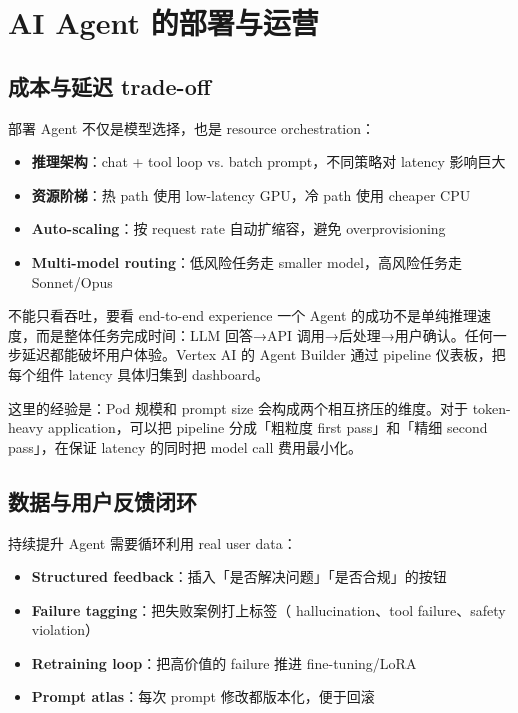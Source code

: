 \section{AI Agent 的部署与运营}

\subsection{成本与延迟 trade-off}

部署 Agent 不仅是模型选择，也是 resource orchestration：

\begin{itemize}
    \item \textbf{推理架构}：chat + tool loop vs. batch prompt，不同策略对 latency 影响巨大
    \item \textbf{资源阶梯}：热 path 使用 low-latency GPU，冷 path 使用 cheaper CPU
    \item \textbf{Auto-scaling}：按 request rate 自动扩缩容，避免 overprovisioning
    \item \textbf{Multi-model routing}：低风险任务走 smaller model，高风险任务走 Sonnet/Opus
\end{itemize}

\begin{importantbox}{不能只看吞吐，要看 end-to-end experience}
一个 Agent 的成功不是单纯推理速度，而是整体任务完成时间：LLM 回答→API 调用→后处理→用户确认。任何一步延迟都能破坏用户体验。Vertex AI 的 Agent Builder 通过 pipeline 仪表板，把每个组件 latency 具体归集到 dashboard。
\end{importantbox}

这里的经验是：Pod 规模和 prompt size 会构成两个相互挤压的维度。对于 token-heavy application，可以把 pipeline 分成「粗粒度 first pass」和「精细 second pass」，在保证 latency 的同时把 model call 费用最小化。

\subsection{数据与用户反馈闭环}

持续提升 Agent 需要循环利用 real user data：

\begin{itemize}
    \item \textbf{Structured feedback}：插入「是否解决问题」「是否合规」的按钮
    \item \textbf{Failure tagging}：把失败案例打上标签（ hallucination、tool failure、safety violation）
    \item \textbf{Retraining loop}：把高价值的 failure 推进 fine-tuning/LoRA
    \item \textbf{Prompt atlas}：每次 prompt 修改都版本化，便于回滚
\end{itemize}

